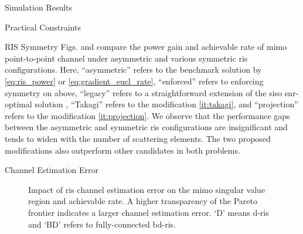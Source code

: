 \documentclass[journal]{IEEEtran}
\begin{document}
\begin{section}{Simulation Results}
\begin{subsection}{Practical Constraints}
\begin{subsubsection}{RIS Symmetry}
			Figs.  and  compare the power gain and achievable rate of \gls{mimo} point-to-point channel under asymmetric and various symmetric \gls{ris} configurations.
			Here, ``asymmetric'' refers to the benchmark solution by \eqref{eq:ris_power} or \eqref{eq:gradient_eucl_rate}, ``enforced'' refers to enforcing symmetry on above, ``legacy'' refers to a straightforward extension of the \gls{siso} \gls{snr}-optimal solution \cite[(6)]{Santamaria2023}, ``Takagi'' refers to the modification \ref{it:takagi}, and ``projection'' refers to the modification \ref{it:projection}.
			We observe that the performance gaps between the asymmetric and symmetric \gls{ris} configurations are insignificant and tends to widen with the number of scattering elements.
			The two proposed modifications also outperform other candidates in both problems.
		\end{subsubsection}

		\begin{subsubsection}{Channel Estimation Error}
			\label{sc:estimation_error}
			\begin{figure}[!t]
				\centering
				\caption{
					Impact of \gls{ris} channel estimation error on the \gls{mimo} singular value region and achievable rate.
					A higher transparency of the Pareto frontier indicates a larger channel estimation error.
					`D' means \gls{d}-\gls{ris} and `BD' refers to fully-connected \gls{bd}-\gls{ris}.
				}
			\end{figure}


\end{subsubsection}
\end{subsection}
\end{section}
\end{document}
